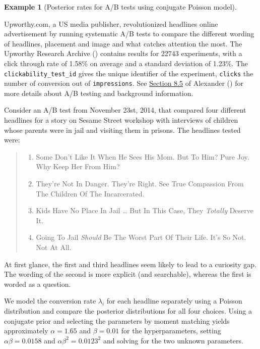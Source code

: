 \documentclass[
  11pt,
  letterpaper,
]{scrbook}
\providecommand{\tightlist}{%
  \setlength{\itemsep}{0pt}\setlength{\parskip}{0pt}}\usepackage{longtable,booktabs,array}
\theoremstyle{definition}
\theoremstyle{plain}
\theoremstyle{plain}
\theoremstyle{definition}
\newtheorem{example}{Example}[chapter]
\theoremstyle{definition}
\theoremstyle{remark}
\begin{document}
\begin{example}[Posterior rates for A/B tests using conjugate Poisson
model]\protect\hypertarget{exm-abtest}{}\label{exm-abtest}

Upworthy.com, a US media publisher, revolutionized headlines online
advertisement by running systematic A/B tests to compare the different
wording of headlines, placement and image and what catches attention the
most. The Upworthy Research Archive () contains results for 22743 experiments, with a click
through rate of 1.58\% on average and a standard deviation of 1.23\%.
The \texttt{clickability\_test\_id} gives the unique identifier of the
experiment, \texttt{clicks} the number of conversion out of
\texttt{impressions}. See
\href{https://tellingstorieswithdata.com/08-hunt.html\#ab-testing}{Section
8.5} of Alexander () for more details
about A/B testing and background information.

Consider an A/B test from November 23st, 2014, that compared four
different headlines for a story on Sesame Street workshop with
interviews of children whose parents were in jail and visiting them in
prisons. The headlines tested were:

\begin{quote}
\begin{enumerate}
\def\labelenumi{\arabic{enumi}.}
\tightlist
\item
  Some Don't Like It When He Sees His Mom. But To Him? Pure Joy. Why
  Keep Her From Him?
\item
  They're Not In Danger. They're Right. See True Compassion From The
  Children Of The Incarcerated.
\item
  Kids Have No Place In Jail \ldots{} But In This Case, They
  \emph{Totally} Deserve It.
\item
  Going To Jail \emph{Should} Be The Worst Part Of Their Life. It's So
  Not. Not At All.
\end{enumerate}
\end{quote}

At first glance, the first and third headlines seem likely to lead to a
curiosity gap. The wording of the second is more explicit (and
searchable), whereas the first is worded as a question.

We model the conversion rate \(\lambda_i\) for each headline separately
using a Poisson distribution and compare the posterior distributions for
all four choices. Using a conjugate prior and selecting the parameters
by moment matching yields approximately \(\alpha = 1.65\) and
\(\beta = 0.01\) for the hyperparameters, setting
\(\alpha\beta = 0.0158\) and \(\alpha\beta^2=0.0123^2\) and solving for
the two unknown parameters.


\end{example}
\end{document}
